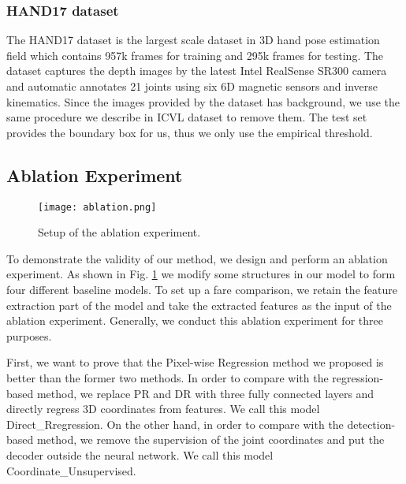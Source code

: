 \documentclass[journal]{IEEEtran}
\begin{document}
\subsubsection{HAND17 dataset}

The HAND17 dataset\cite{yuan2018depth} is the largest scale dataset in 3D hand pose estimation field 
which contains 957k frames for training and 295k frames for testing. 
The dataset captures the depth images by the latest Intel RealSense SR300 camera and 
automatic annotates 21 joints using six 6D magnetic sensors and inverse kinematics. 
Since the images provided by the dataset has background, we use the same procedure we describe in ICVL dataset to remove them. 
The test set provides the boundary box for us, thus we only use the empirical threshold.

\subsection{Ablation Experiment}

\begin{figure}[!t]
  \centering
  \texttt{[image: ablation.png]}
  \caption{Setup of the ablation experiment.}
  \label{Ablation_setup}
\end{figure}

To demonstrate the validity of our method, we design and perform an ablation experiment. 
As shown in Fig\@. \ref{Ablation_setup} we modify some structures in our model to form four different baseline models. 
To set up a fare comparison, we retain the feature extraction part of the model and take the extracted features as the input of the ablation experiment. 
Generally, we conduct this ablation experiment for three purposes. 

First, we want to prove that the Pixel-wise Regression method we proposed is better than the former two methods. 
In order to compare with the regression-based method, 
we replace PR and DR with three fully connected layers and directly regress 3D coordinates from features. 
We call this model Direct\_Rregression. 
On the other hand, in order to compare with the detection-based method, 
we remove the supervision of the joint coordinates and put the decoder outside the neural network. 
We call this model Coordinate\_Unsupervised. 
\end{document}
